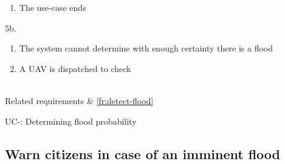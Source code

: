 \begin{table}[H]
{{\begin{enumerate}
		  \item The use-case ends
		\end{enumerate}
		\item[5b.]
		\begin{enumerate}
		  \item The system cannot determine with enough certainty there is a flood
		  \item A UAV is dispatched to check
		\end{enumerate}
		}\\
	Related requirements & \ref{fr:detect-flood} \\
}
\caption{UC-: Determining flood probability}
\label{table:uc-determine-flood-probability}
\end{table}

\clearpage
\subsection{Warn citizens in case of an imminent flood}
